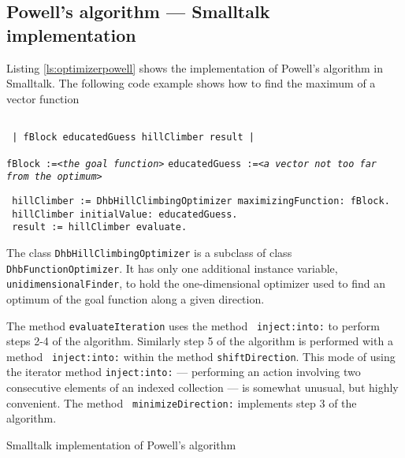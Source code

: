 \documentclass[twoside]{book}
\begin{document}
\subsection{Powell's algorithm --- Smalltalk implementation}
 Listing \ref{ls:optimizerpowell}
shows the implementation of Powell's algorithm in Smalltalk. The
following code example shows how to find the maximum of a vector
function
\begin{codeExample}
\label{ex:spowell}
\begin{verbatim}

 | fBlock educatedGuess hillClimber result |
\end{verbatim}
 {\tt fBlock :=<\sl the goal function\tt >}\hfil\break
 {\tt educatedGuess :=<\sl a vector not too far from the optimum\tt >}
\begin{verbatim}
 hillClimber := DhbHillClimbingOptimizer maximizingFunction: fBlock.
 hillClimber initialValue: educatedGuess.
 result := hillClimber evaluate.
\end{verbatim}
\end{codeExample}
The class {\tt DhbHillClimbingOptimizer} is a subclass of class
{\tt DhbFunctionOptimizer}. It has only one additional instance
variable, {\tt unidimensionalFinder}, to hold the one-dimensional
optimizer used to find an optimum of the goal function along a
given direction.

The method {\tt evaluateIteration} uses the method {\tt
inject:into:} to perform steps 2-4 of the algorithm. Similarly
step 5 of the algorithm is performed with a method {\tt
inject:into:} within the method {\tt shiftDirection}. This mode of
using the iterator method {\tt inject:into:} --- performing an
action involving two consecutive elements of an indexed collection
--- is somewhat unusual, but highly convenient\cite{Beck}. The method {\tt
minimizeDirection:} implements step 3 of the algorithm.

\begin{listing} Smalltalk implementation of Powell's algorithm
\label{ls:optimizerpowell}

\end{listing}
\end{document}
